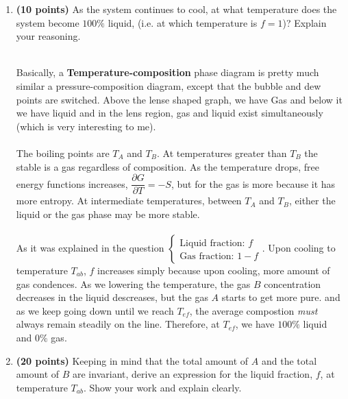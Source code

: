\documentclass[fleqn]{article}
\begin{document}
  \begin{enumerate}
    \item \textbf{(10 points)} As the system continues to cool, at what temperature does the system become
    $100\%$ liquid, (i.e. at which temperature is $f=1$)? Explain your reasoning.

      \textcolor{hwColor}{
        \\
        Basically, a \textbf{Temperature-composition} phase diagram is pretty much similar a pressure-composition
        diagram, except that the bubble and dew points are switched. Above the lense shaped graph, we have Gas and
        below it we have liquid and in the lens region, gas and liquid exist simultaneously 
        (which is very interesting to me).
        \\
        \\
        The boiling points are $T_A$ and $T_B$. At temperatures greater than $T_B$ the stable is a gas regardless of
        composition. As the temperature drops, free energy functions increases, $\dfrac{\partial G}{\partial T}=-S$,
        but for the gas is more because it has more entropy. At intermediate temperatures, between $T_A$ and $T_B$,
        either the liquid or the gas phase may be more stable.
        \\
        \\
        As it was explained in the question $\begin{cases}
          \text{Liquid fraction: } f 
          \\
          \text{Gas fraction: } 1-f 
        \end{cases}$. Upon cooling to temperature $T_{ab}$, $f$ increases simply because upon cooling, more amount 
        of gas condences. As we lowering the temperature, the gas $B$ concentration decreases in the liquid 
        descreases, but the gas $A$ starts to get more pure. and as we keep going down until we reach $T_{ef}$, 
        the average compostion \emph{must} always remain steadily on the line. Therefore, at $T_{ef}$, we have 
        $100\%$ liquid and $0\%$ gas.
        \\
      }
         
    \item \textbf{(20 points)} Keeping in mind that the total amount of $A$ and the total amount of $B$ 
    are invariant, derive an expression for the liquid fraction, $f$, at temperature $T_{ab}$. Show your work
    and explain clearly.


\end{enumerate}
\end{document}
